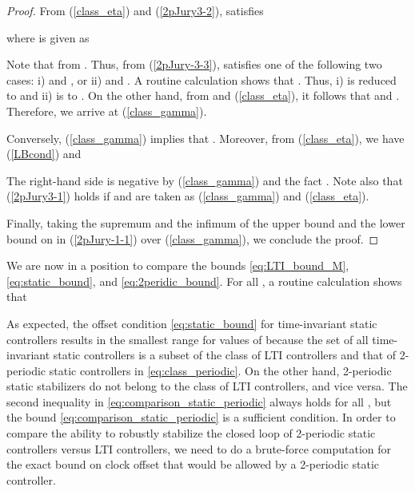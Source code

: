 \documentclass[letterpaper, 12pt, draftcls, onecolumn]{ieeeconf}
\begin{document}
\begin{proof}
From (\ref{class_eta}) and (\ref{2pJury3-2}),  satisfies

where  is given as

Note that  from .
Thus, from (\ref{2pJury-3-3}),  satisfies one of the following two cases:
i)  and , or
ii)  and .
A routine calculation shows that .
Thus, i) is reduced to  and ii) is 
to .
On the other hand, from  and (\ref{class_eta}), it follows that
 and .
Therefore, we arrive at (\ref{class_gamma}). 


Conversely, (\ref{class_gamma}) implies that .
Moreover, from (\ref{class_eta}), we have (\ref{LBcond}) and

The right-hand side is negative by (\ref{class_gamma}) and the fact
.
Note also that (\ref{2pJury3-1}) holds if  and  are taken as
(\ref{class_gamma}) and (\ref{class_eta}).

Finally, taking the supremum and the infimum of the upper bound and the lower
bound on  in (\ref{2pJury-1-1}) over (\ref{class_gamma}), we conclude
the proof.
\end{proof}


We are now in a position to compare the bounds
\eqref{eq:LTI_bound_M}, \eqref{eq:static_bound}, and
\eqref{eq:2peridic_bound}.
For all , a routine calculation shows that 

As expected, the offset condition \eqref{eq:static_bound}
for time-invariant static controllers 
results in the smallest range for values of 
because the set of all time-invariant static controllers
is a subset of the class of LTI controllers and 
that of 2-periodic static controllers in \eqref{eq:class_periodic}.
On the other hand,
2-periodic static stabilizers do not belong to the class of LTI controllers,
and vice versa.
The second inequality in \eqref{eq:comparison_static_periodic}
always holds for all , but the bound \eqref{eq:comparison_static_periodic}
is a sufficient condition.
In order to compare 
the ability to robustly stabilize the closed loop of
2-periodic static controllers versus
LTI controllers, we need to do a brute-force computation for 
the exact bound on clock offset that would be allowed by
a 2-periodic static controller. 
\end{document}
